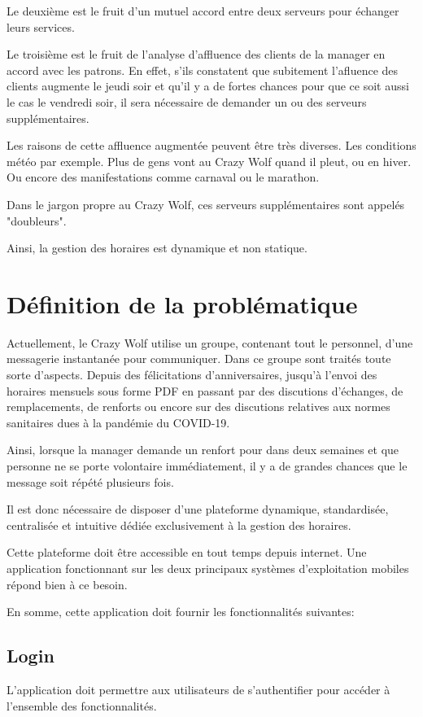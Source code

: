 Le deuxième est le fruit d'un mutuel accord entre deux serveurs pour échanger leurs services.

Le troisième est le fruit de l'analyse d’affluence  des clients de la manager en accord avec les patrons. En effet, s'ils constatent que subitement l'afluence des clients augmente le jeudi soir et qu'il y a de fortes chances pour que ce soit aussi le cas le vendredi soir, il sera nécessaire de demander un ou des serveurs supplémentaires. 

Les raisons de cette affluence augmentée peuvent être très diverses. Les conditions météo par exemple. Plus de gens vont au Crazy Wolf quand il pleut, ou en hiver. Ou encore des manifestations comme carnaval ou le marathon.

Dans le jargon propre au Crazy Wolf, ces serveurs supplémentaires sont appelés "doubleurs".

Ainsi, la gestion des horaires est dynamique et non statique.
\newpage
\section[Problématique]{Définition de la problématique}
Actuellement, le Crazy Wolf utilise un groupe, contenant tout le personnel, d'une messagerie instantanée pour communiquer. Dans ce groupe sont traités toute sorte d'aspects. Depuis des félicitations d'anniversaires, jusqu'à l'envoi des horaires mensuels sous forme PDF en passant par des discutions d'échanges, de remplacements, de renforts ou encore sur des discutions relatives aux normes sanitaires dues à la pandémie du COVID-19. 

Ainsi, lorsque la manager demande un renfort pour dans deux semaines et que personne ne se porte volontaire immédiatement, il y a de grandes chances que le message soit répété plusieurs fois.

Il est donc nécessaire de disposer d'une plateforme dynamique, standardisée, centralisée et intuitive dédiée exclusivement à la gestion des horaires. 

Cette plateforme doit être accessible en tout temps depuis internet. Une application fonctionnant sur les deux principaux systèmes d'exploitation mobiles répond bien à ce besoin.

En somme, cette application doit fournir les fonctionnalités suivantes:

\subsection*{Login}
L'application doit permettre aux utilisateurs de s'authentifier pour accéder à l'ensemble des fonctionnalités.

